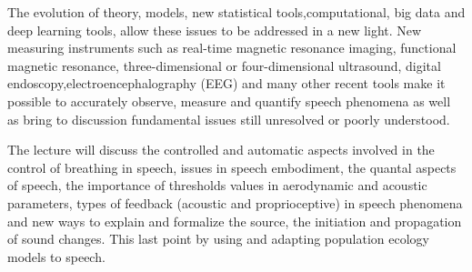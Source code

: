 The evolution of theory, models, new statistical tools,computational, big data
and deep learning tools, allow these issues to be addressed in a new light. New
measuring instruments such as real-time magnetic resonance imaging, functional
magnetic resonance, three-dimensional or four-dimensional ultrasound, digital
endoscopy,electroencephalography (EEG) and many other recent tools make
it possible to accurately observe, measure and quantify speech phenomena as well
as bring to discussion fundamental issues still unresolved or poorly understood. 

The lecture will discuss the controlled and automatic aspects involved in the
control of breathing in speech, issues in speech embodiment, the quantal
aspects of speech, the importance of thresholds values in aerodynamic and
acoustic parameters, types of feedback (acoustic and proprioceptive) in speech
phenomena and new ways to explain and formalize the source, the initiation and
propagation of sound changes. This last point by using and adapting
population ecology models to speech. 


%
%
